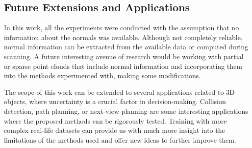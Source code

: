     \subsection{Future Extensions and Applications}
    In this work, all the experiments were conducted with the assumption that no information about the normals was available. Although not completely reliable, normal information can be extracted from the available data or computed during scanning. A future interesting avenue of research would be working with partial or sparse point clouds that include normal information and incorporating them into the methods experimented with, making some modifications. 
    \newline

    The scope of this work can be extended to several applications related to 3D objects, where uncertainty is a crucial factor in decision-making. Collision detection, path planning, or next-view planning are some interesting applications where the proposed methods can be rigorously tested. Training with more complex real-life datasets can provide us with much more insight into the limitations of the methods used and offer new ideas to further improve them.